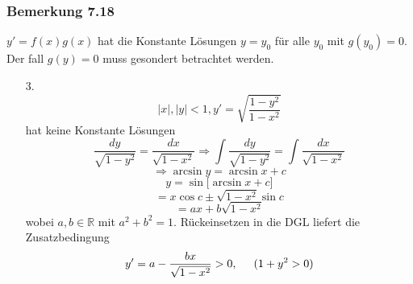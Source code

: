 \subsubsection*{Bemerkung 7.18}
$y'=f(x)g(x)$ hat die Konstante Lösungen $y=y_0$ für alle $y_0$ mit $g(y_0)=0$. Der fall $g(y)=0$ muss gesondert betrachtet werden. 
\begin{enumerate}
\item[3.] $$\left| x\right|, \left| y\right|<1,y'=\sqrt{\frac{1-y^2}{1-x^2}}$$
hat keine Konstante Lösungen 
$$\frac{{dy}}{{\sqrt {1 - {y^2}} }} = \frac{{dx}}{{\sqrt {1 - {x^2}} }} \Rightarrow \int {\frac{{dy}}{{\sqrt {1 - {y^2}} }}}  = \int {\frac{{dx}}{{\sqrt {1 - {x^2}} }}} $$
$$\Rightarrow \arcsin y=\arcsin x+c$$
$$y=\sin\lbrack\arcsin x+c \rbrack$$
$$=x\cos c\pm\sqrt{1-x^2}\sin c$$
$$=ax+b\sqrt{1-x^2}$$
wobei $a,b\in\mathbb{R}$ mit $a^2+b^2=1$. Rückeinsetzen in die DGL liefert die Zusatzbedingung $$y'=a-\frac{bx}{\sqrt{1-x^2}}>0,\hspace{5mm} (1+y^2>0)$$
\end{enumerate}